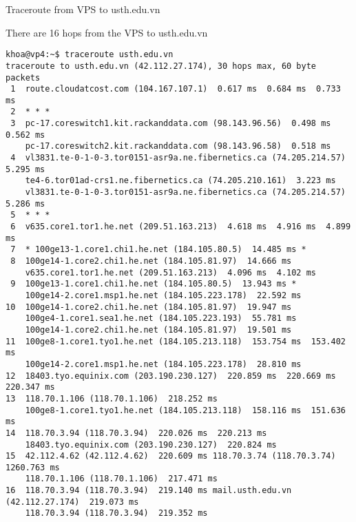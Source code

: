 \documentclass{report}
\begin{document}
\begin{section}{Traceroute from VPS to usth.edu.vn}

There are 16 hops from the VPS to usth.edu.vn

\begin{verbatim}
khoa@vp4:~$ traceroute usth.edu.vn
traceroute to usth.edu.vn (42.112.27.174), 30 hops max, 60 byte packets
 1  route.cloudatcost.com (104.167.107.1)  0.617 ms  0.684 ms  0.733 ms
 2  * * *
 3  pc-17.coreswitch1.kit.rackanddata.com (98.143.96.56)  0.498 ms  0.562 ms 
    pc-17.coreswitch2.kit.rackanddata.com (98.143.96.58)  0.518 ms
 4  vl3831.te-0-1-0-3.tor0151-asr9a.ne.fibernetics.ca (74.205.214.57)  5.295 ms 
    te4-6.tor01ad-crs1.ne.fibernetics.ca (74.205.210.161)  3.223 ms 
    vl3831.te-0-1-0-3.tor0151-asr9a.ne.fibernetics.ca (74.205.214.57)  5.286 ms
 5  * * *
 6  v635.core1.tor1.he.net (209.51.163.213)  4.618 ms  4.916 ms  4.899 ms
 7  * 100ge13-1.core1.chi1.he.net (184.105.80.5)  14.485 ms *
 8  100ge14-1.core2.chi1.he.net (184.105.81.97)  14.666 ms 
    v635.core1.tor1.he.net (209.51.163.213)  4.096 ms  4.102 ms
 9  100ge13-1.core1.chi1.he.net (184.105.80.5)  13.943 ms * 
    100ge14-2.core1.msp1.he.net (184.105.223.178)  22.592 ms
10  100ge14-1.core2.chi1.he.net (184.105.81.97)  19.947 ms 
    100ge4-1.core1.sea1.he.net (184.105.223.193)  55.781 ms 
    100ge14-1.core2.chi1.he.net (184.105.81.97)  19.501 ms
11  100ge8-1.core1.tyo1.he.net (184.105.213.118)  153.754 ms  153.402 ms 
    100ge14-2.core1.msp1.he.net (184.105.223.178)  28.810 ms
12  18403.tyo.equinix.com (203.190.230.127)  220.859 ms  220.669 ms  220.347 ms
13  118.70.1.106 (118.70.1.106)  218.252 ms 
    100ge8-1.core1.tyo1.he.net (184.105.213.118)  158.116 ms  151.636 ms
14  118.70.3.94 (118.70.3.94)  220.026 ms  220.213 ms 
    18403.tyo.equinix.com (203.190.230.127)  220.824 ms
15  42.112.4.62 (42.112.4.62)  220.609 ms 118.70.3.74 (118.70.3.74)  1260.763 ms 
    118.70.1.106 (118.70.1.106)  217.471 ms
16  118.70.3.94 (118.70.3.94)  219.140 ms mail.usth.edu.vn (42.112.27.174)  219.073 ms 
    118.70.3.94 (118.70.3.94)  219.352 ms

\end{verbatim}
\end{section}
\end{document}
